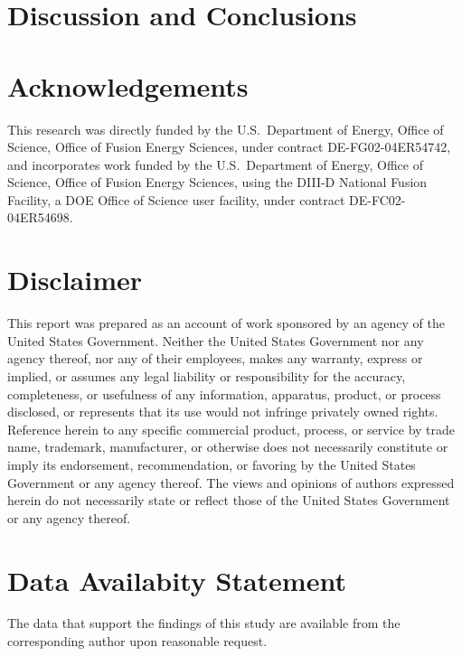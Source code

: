 \documentclass[12pt,prb,aps]{revtex4-1}
\begin{document}
\section{Discussion and Conclusions}

\section*{Acknowledgements}
This research was directly funded by the U.S.\ Department of Energy, Office of Science, Office of Fusion Energy Sciences,  under contract DE-FG02-04ER54742, and
incorporates work funded by the U.S.\ Department of Energy, Office of Science, Office of Fusion Energy Sciences, using the DIII-D National Fusion Facility, a DOE Office of Science user facility, under contract DE-FC02-04ER54698.  

\section*{Disclaimer} This report was prepared as an account of work sponsored by an agency of the United States Government. Neither the United States Government nor any agency thereof, nor any of their employees, makes any warranty, express or implied, or assumes any legal liability or responsibility for the accuracy, completeness, or usefulness of any information, apparatus, product, or process disclosed, or represents that its use would not infringe privately owned rights. Reference herein to any specific commercial product, process, or service by trade name, trademark, manufacturer, or otherwise does not necessarily constitute or imply its endorsement, recommendation, or favoring by the United States Government or any agency thereof. The views and opinions of authors expressed herein do not necessarily state or reflect those of the United States Government or any agency thereof. 
 
\section*{Data Availabity Statement}
The data that support the findings of this study are available from the corresponding author upon reasonable request.
 
\end{document}

